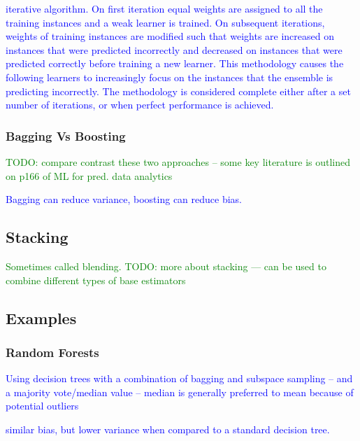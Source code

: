 \textcolor{blue}{iterative algorithm. On first iteration equal weights are assigned to all the training instances and a weak learner is trained. On subsequent iterations, weights of training instances are modified such that weights are increased on instances that were predicted incorrectly and decreased on instances that were predicted correctly before training a new learner. This methodology causes the following learners to increasingly focus on the instances that the ensemble is predicting incorrectly. The methodology is considered complete either after a set number of iterations, or when perfect performance is achieved.}


\subsubsection{Bagging Vs Boosting}

\textcolor{green}{TODO: compare contrast these two approaches -- some key literature is outlined on p166 of ML for pred. data analytics}

\textcolor{blue}{Bagging can reduce variance, boosting can reduce bias.}

\subsection{Stacking}

\textcolor{green}{Sometimes called {blending}. TODO: more about stacking --- can be used to combine different types of base estimators}


\subsection{Examples}

\subsubsection{Random Forests}

\textcolor{blue}{Using decision trees with a combination of bagging and subspace sampling -- and a majority vote/median value -- median is generally preferred to mean because of potential outliers}

\textcolor{blue}{similar bias, but lower variance when compared to a standard decision tree.}
